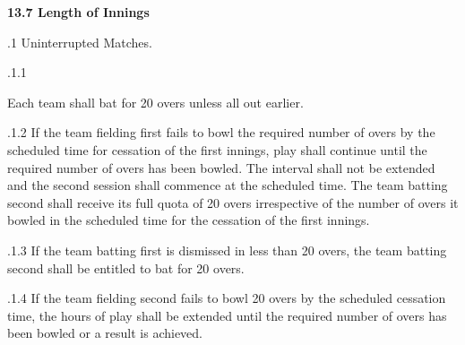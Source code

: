 \documentclass[12pt]{article}
\begin{document}
\vspace{\baselineskip}
{\fontsize{11pt}{13.2pt}\selectfont \textbf{13.7 \tabto{0.47in} Length of Innings}\par}\par


\vspace{\baselineskip}
{\fontsize{9pt}{10.8pt}.1 \tabto{0.49in} Uninterrupted Matches.\par}\par


\vspace{\baselineskip}
\begin{adjustwidth}{0.49in}{0.0in}
{\fontsize{9pt}{10.8pt}.1.1 \tabto{1.17in} {\fontsize{8pt}{9.6pt}\selectfont Each team shall bat for 20 overs unless all out earlier.\par}\par}\par

\end{adjustwidth}


\vspace{\baselineskip}
\begin{adjustwidth}{1.18in}{0.14in}
{\fontsize{9pt}{10.8pt}.1.2 \tabto{1.17in} If the team fielding first fails to bowl the required number of overs by the scheduled time for cessation of the first innings, play shall continue until the required number of overs has been bowled. The interval shall not be extended and the second session shall commence at the scheduled time. The team batting second shall receive its full quota of 20 overs irrespective of the number of overs it bowled in the scheduled time for the cessation of the first innings.\par}\par

\end{adjustwidth}


\vspace{\baselineskip}
\begin{adjustwidth}{1.18in}{0.32in}
{\fontsize{9pt}{10.8pt}.1.3 \tabto{1.17in} If the team batting first is dismissed in less than 20 overs, the team batting second shall be entitled to bat for 20 overs.\par}\par

\end{adjustwidth}


\vspace{\baselineskip}
\begin{adjustwidth}{1.18in}{0.11in}
{\fontsize{9pt}{10.8pt}.1.4 \tabto{1.17in} If the team fielding second fails to bowl 20 overs by the scheduled cessation time, the hours of play shall be extended until the required number of overs has been bowled or a result is achieved.\par}\par

\end{adjustwidth}
\end{document}

